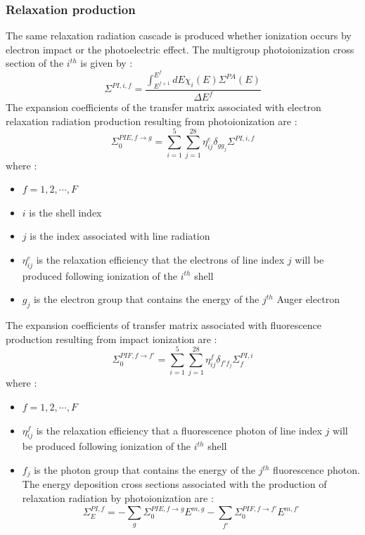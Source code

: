 \subsubsection{Relaxation production}
The same relaxation radiation cascade is produced whether ionization occurs
by electron impact or the photoelectric effect. The multigroup photoionization
cross section of the $i^{th}$ is given by :
\begin{equation}
\Sigma^{PI,i,f} = \frac{\int_{E^{f+1}}^{E^f} dE \chi_i(E) \Sigma^{PA}(E)}{\Delta E^f}
\end{equation}
The expansion coefficients of the transfer matrix associated with electron
relaxation radiation production resulting from photoionization are :
\begin{equation}
\Sigma_0^{PIE,f\rightarrow g} = \sum_{i=1}^5 \sum_{j=1}^{28} \eta_{ij}^e
\delta_{gg_j} \Sigma^{PI,i,f}
\end{equation}
where :
\begin{itemize}
\item $f=1,2,\cdots,F$
\item $i$ is the shell index
\item $j$ is the index associated with line radiation
\item $\eta_{ij}^e$ is the relaxation efficiency that the electrons of line
index $j$ will be produced following ionization of the $i^{th}$ shell
\item $g_j$ is the electron group that contains the energy of the $j^{th}$
Auger electron
\end{itemize}
The expansion coefficients of transfer matrix associated with fluorescence
production resulting from impact ionization are :
\begin{equation}
\Sigma_0^{PIF,f\rightarrow f'} = \sum_{i=1}^5 \sum_{j=1}^{28} \eta_{ij}^f
\delta_{f' f_j} \Sigma_f^{PI,i}
\end{equation}
where :
\begin{itemize}
\item $f=1,2,\cdots,F$
\item $\eta_{ij}^f$ is the relaxation efficiency that a fluorescence photon of
line index $j$ will be produced following ionization of the $i^{th}$ shell
\item $f_j$ is the photon group that contains the energy of the $j^{th}$
fluorescence photon.\\
The energy deposition cross sections associated with the production of
relaxation radiation by photoionization are :
\begin{equation}
\Sigma_E^{PI,f} = - \sum_g \Sigma_0^{PIE,f\rightarrow g} E^{m,g} - \sum_{f'}
\Sigma_0^{PIF,f\rightarrow f'} E^{m,f'}
\end{equation}
\end{itemize}

